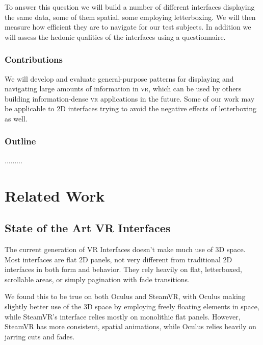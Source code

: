 \documentclass{tufte-book} %
\begin{document}
To answer this question we will build a number of different interfaces displaying the same data, some of them spatial, some employing letterboxing. We will then measure how efficient they are to navigate for our test subjects. In addition we will assess the hedonic qualities of the interfaces using a questionnaire.

\subsection{Contributions}
We will develop and evaluate general-purpose patterns for displaying and navigating large amounts of information in \textsc{vr}, which can be used by others building information-dense \textsc{vr} applications in the future. Some of our work may be applicable to 2D interfaces trying to avoid the negative effects of letterboxing as well.

\subsection{Outline}

.........



\chapter{Related Work}
\label{ch:related-work}

\section{State of the Art VR Interfaces}
The current generation of VR Interfaces doesn't make much use of 3D space. Most interfaces are flat 2D panels, not very different from traditional 2D interfaces in both form and behavior. They rely heavily on flat, letterboxed, scrollable areas, or simply pagination with fade transitions.

We found this to be true on both Oculus and SteamVR, with Oculus making slightly better use of the 3D space by employing freely floating elements in space, while SteamVR's interface relies mostly on monolithic flat panels.
However, SteamVR has more consistent, spatial animations, while Oculus relies heavily on jarring cuts and fades.
\end{document}
